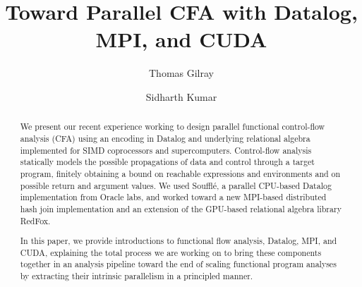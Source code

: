 \documentclass[acmlarge]{acmart}
\begin{document}
\title[Paper: Toward Parallel CFA with Datalog, MPI, and CUDA]{Toward Parallel CFA with Datalog, MPI, and CUDA}

\author{Thomas Gilray}
\author{Sidharth Kumar}




\begin{abstract} 
%
  We present our recent experience working to design parallel functional control-flow analysis (CFA)
  using an encoding in Datalog and underlying relational algebra implemented for SIMD coprocessors and supercomputers.
  Control-flow analysis statically models the possible propagations of data and control through
  a target program, finitely obtaining a bound on reachable expressions and environments and on 
  possible return and argument values.
  We used Souffl\'e, a parallel CPU-based Datalog implementation from Oracle labs, and
  worked toward a new MPI-based distributed hash join implementation and an extension of the
  GPU-based relational algebra library RedFox.

  
  In this paper, we provide introductions to functional flow analysis, Datalog, MPI, and CUDA, explaining the total
  process we are working on to bring these components together in an analysis pipeline toward the end of scaling
  functional program analyses by extracting their intrinsic parallelism in a principled manner.
%
\end{abstract}


\maketitle 
\thispagestyle{firstfancy}













\balance
 
{%

}

\end{document}

